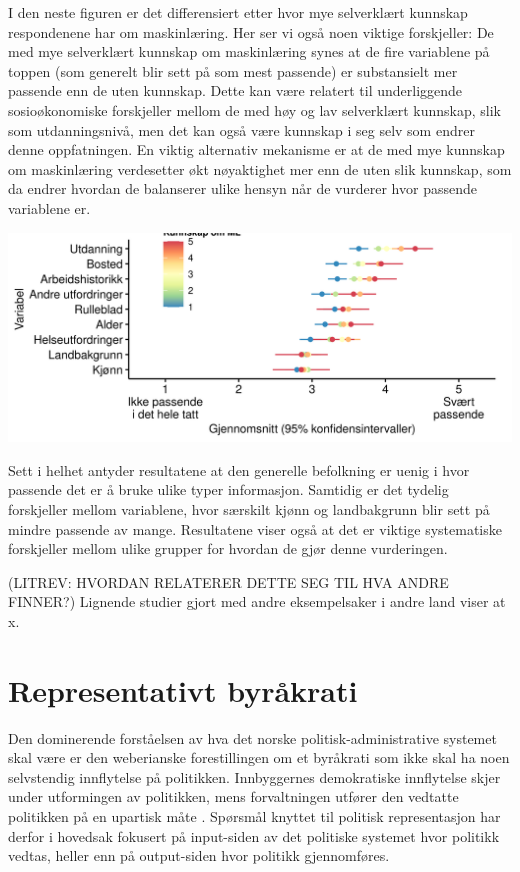 \documentclass[
]{book}
\begin{document}
I den neste figuren er det differensiert etter hvor mye selverklært kunnskap respondenene har om maskinlæring. Her ser vi også noen viktige forskjeller: De med mye selverklært kunnskap om maskinlæring synes at de fire variablene på toppen (som generelt blir sett på som mest passende) er substansielt mer passende enn de uten kunnskap. Dette kan være relatert til underliggende sosioøkonomiske forskjeller mellom de med høy og lav selverklært kunnskap, slik som utdanningsnivå, men det kan også være kunnskap i seg selv som endrer denne oppfatningen. En viktig alternativ mekanisme er at de med mye kunnskap om maskinlæring verdesetter økt nøyaktighet mer enn de uten slik kunnskap, som da endrer hvordan de balanserer ulike hensyn når de vurderer hvor passende variablene er.

\includegraphics{figs/png/fig_vars_avg_ml_know.png}

Sett i helhet antyder resultatene at den generelle befolkning er uenig i hvor passende det er å bruke ulike typer informasjon. Samtidig er det tydelig forskjeller mellom variablene, hvor særskilt kjønn og landbakgrunn blir sett på mindre passende av mange. Resultatene viser også at det er viktige systematiske forskjeller mellom ulike grupper for hvordan de gjør denne vurderingen.

(LITREV: HVORDAN RELATERER DETTE SEG TIL HVA ANDRE FINNER?)
Lignende studier gjort med andre eksempelsaker i andre land viser at x.

\hypertarget{representasjon}{%
\chapter{Representativt byråkrati}\label{representasjon}}

Den dominerende forståelsen av hva det norske politisk-administrative systemet skal være er den weberianske forestillingen om et byråkrati som ikke skal ha noen selvstendig innflytelse på politikken.
Innbyggernes demokratiske innflytelse skjer under utformingen av politikken, mens forvaltningen utfører den vedtatte politikken på en upartisk måte \citep{rothstein2009creating, rosanvallon2011democratic}.
Spørsmål knyttet til politisk representasjon har derfor i hovedsak fokusert på input-siden av det politiske systemet hvor politikk vedtas, heller enn på output-siden hvor politikk gjennomføres.
\end{document}
